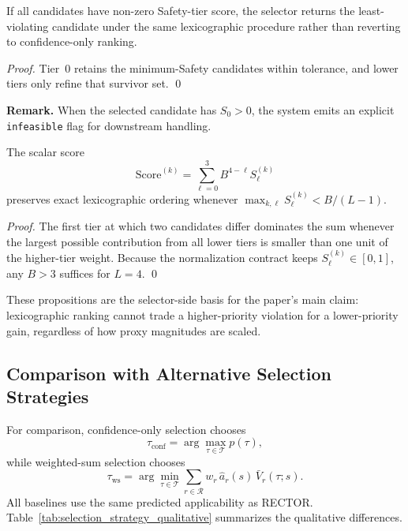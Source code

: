\begin{proposition}
\label{thm:infeasibility}
If all candidates have non-zero Safety-tier score, the selector returns the least-violating candidate under the same lexicographic procedure rather than reverting to confidence-only ranking.
\end{proposition}
\begin{proof}
Tier~0 retains the minimum-Safety candidates within tolerance, and lower tiers only refine that survivor set. \qed
\end{proof}

\noindent\textbf{Remark.} When the selected candidate has $S_0>0$, the system emits an explicit \texttt{infeasible} flag for downstream handling.

\begin{proposition}
\label{thm:scalarization}
The scalar score
\begin{equation}
\mathrm{Score}^{(k)}=\sum_{\ell=0}^{3} B^{4-\ell} S_\ell^{(k)}
\end{equation}
preserves exact lexicographic ordering whenever $\max_{k,\ell} S_\ell^{(k)} < B/(L-1)$.
\end{proposition}
\begin{proof}
The first tier at which two candidates differ dominates the sum whenever the largest possible contribution from all lower tiers is smaller than one unit of the higher-tier weight. Because the normalization contract keeps $S_\ell^{(k)} \in [0,1]$, any $B>3$ suffices for $L=4$. \qed
\end{proof}

These propositions are the selector-side basis for the paper's main claim: lexicographic ranking cannot trade a higher-priority violation for a lower-priority gain, regardless of how proxy magnitudes are scaled.

\subsection{Comparison with Alternative Selection Strategies}
\label{subsec:strategy_comparison}

For comparison, confidence-only selection chooses
\begin{equation}
\tau_{\text{conf}}=\arg\max_{\tau \in \mathcal{T}} p(\tau),
\end{equation}
while weighted-sum selection chooses
\begin{equation}
\tau_{\text{ws}}=\arg\min_{\tau \in \mathcal{T}} \sum_{r \in \mathcal{R}} w_r\,\hat{a}_r(s)\,\bar{V}_r(\tau;s).
\end{equation}
All baselines use the same predicted applicability as RECTOR. Table~\ref{tab:selection_strategy_qualitative} summarizes the qualitative differences.

